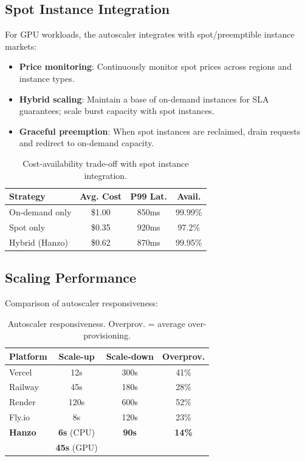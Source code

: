 \documentclass[11pt,twocolumn]{article}
\begin{document}
\subsection{Spot Instance Integration}

For GPU workloads, the autoscaler integrates with spot/preemptible instance markets:

\begin{itemize}[leftmargin=1.1em]
    \item \textbf{Price monitoring}: Continuously monitor spot prices across regions and instance types.
    \item \textbf{Hybrid scaling}: Maintain a base of on-demand instances for SLA guarantees; scale burst capacity with spot instances.
    \item \textbf{Graceful preemption}: When spot instances are reclaimed, drain requests and redirect to on-demand capacity.
\end{itemize}

\begin{table}[H]
\centering
\small
\begin{tabular}{lccc}
\toprule
\textbf{Strategy} & \textbf{Avg. Cost} & \textbf{P99 Lat.} & \textbf{Avail.} \\
\midrule
On-demand only & \$1.00 & 850ms & 99.99\% \\
Spot only & \$0.35 & 920ms & 97.2\% \\
Hybrid (Hanzo) & \$0.62 & 870ms & 99.95\% \\
\bottomrule
\end{tabular}
\caption{Cost-availability trade-off with spot instance integration.}
\label{tab:spot}
\end{table}

\subsection{Scaling Performance}

Comparison of autoscaler responsiveness:

\begin{table}[H]
\centering
\small
\begin{tabular}{lccc}
\toprule
\textbf{Platform} & \textbf{Scale-up} & \textbf{Scale-down} & \textbf{Overprov.} \\
\midrule
Vercel & 12s & 300s & 41\% \\
Railway & 45s & 180s & 28\% \\
Render & 120s & 600s & 52\% \\
Fly.io & 8s & 120s & 23\% \\
\textbf{Hanzo} & \textbf{6s} (CPU) & \textbf{90s} & \textbf{14\%} \\
 & \textbf{45s} (GPU) & & \\
\bottomrule
\end{tabular}
\caption{Autoscaler responsiveness. Overprov. = average over-provisioning.}
\label{tab:scaling}
\end{table}
\end{document}
